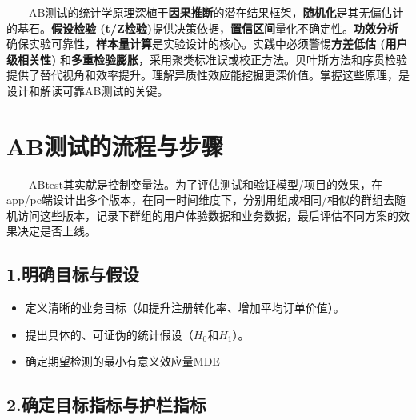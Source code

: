 \documentclass[
  letterpaper,
  DIV=11,
  numbers=noendperiod]{scrreprt}
\begin{document}
  AB测试的统计学原理深植于\textbf{因果推断}的潜在结果框架，\textbf{随机化}是其无偏估计的基石。\textbf{假设检验
(t/Z检验)}提供决策依据，\textbf{置信区间}量化不确定性。\textbf{功效分析}确保实验可靠性，\textbf{样本量计算}是实验设计的核心。实践中必须警惕\textbf{方差低估
(用户级相关性)}
和\textbf{多重检验膨胀}，采用聚类标准误或校正方法。贝叶斯方法和序贯检验提供了替代视角和效率提升。理解异质性效应能挖掘更深价值。掌握这些原理，是设计和解读可靠AB测试的关键。

\section{AB测试的流程与步骤}\label{abux6d4bux8bd5ux7684ux6d41ux7a0bux4e0eux6b65ux9aa4}

  ABtest其实就是控制变量法。为了评估测试和验证模型/项目的效果，在app/pc端设计出多个版本，在同一时间维度下，分别用组成相同/相似的群组去随机访问这些版本，记录下群组的用户体验数据和业务数据，最后评估不同方案的效果决定是否上线。

\subsection{\texorpdfstring{1.\textbf{明确目标与假设}}{1.明确目标与假设}}\label{ux660eux786eux76eeux6807ux4e0eux5047ux8bbe}

\begin{itemize}
\item
  定义清晰的业务目标（如提升注册转化率、增加平均订单价值）。
\item
  提出具体的、可证伪的统计假设（\(H_0\)和\(H_1\)）。
\item
  确定期望检测的最小有意义效应量MDE
\end{itemize}

\subsection{\texorpdfstring{2.\textbf{确定目标指标与护栏指标}}{2.确定目标指标与护栏指标}}\label{ux786eux5b9aux76eeux6807ux6307ux6807ux4e0eux62a4ux680fux6307ux6807}
\end{document}
